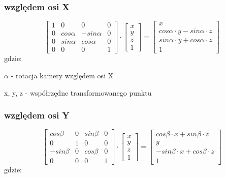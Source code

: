 \documentclass[11pt]{article}
\begin{document}
\subsubsection{względem osi X}
\begin{equation}
    \begin{bmatrix}
        1 & 0 & 0 & 0\\
        0 & cos \alpha & -sin \alpha & 0\\
        0 & sin \alpha & cos \alpha & 0\\
        0 & 0 & 0 & 1
    \end{bmatrix}
    \cdot
    \begin{bmatrix}
        x\\
        y\\
        z\\
        1
    \end{bmatrix}
    =
    \begin{bmatrix}
        x\\
        cos \alpha \cdot y - sin \alpha \cdot z\\
        sin \alpha \cdot y + cos \alpha \cdot z\\
        1
    \end{bmatrix}
\end{equation}
gdzie:

$\alpha$ - rotacja kamery względem osi X

x, y, z - współrzędne transformowanego punktu

\subsubsection{względem osi Y}
\begin{equation}
    \begin{bmatrix}
        cos \beta & 0 & sin \beta & 0\\
        0 & 1 & 0 & 0\\
        -sin \beta & 0 & cos \beta & 0\\
        0 & 0 & 0 & 1
    \end{bmatrix}
    \cdot
    \begin{bmatrix}
        x\\
        y\\
        z\\
        1
    \end{bmatrix}
    =
    \begin{bmatrix}
        cos \beta \cdot x + sin \beta \cdot z\\
        y\\
        -sin \beta \cdot x + cos \beta \cdot z\\
        1
    \end{bmatrix}
\end{equation}
gdzie:
\end{document}
